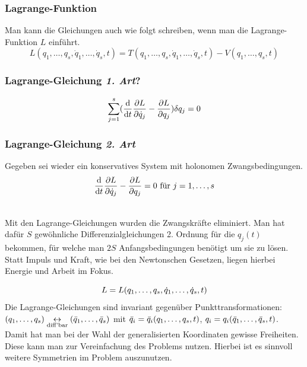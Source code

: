 \subsubsection{Lagrange-Funktion}
Man kann die Gleichungen auch wie folgt schreiben, wenn man die Lagrange-Funktion $L$ einführt.
$$L(q_1, \dots, q_s, \dot{q}_1, \dots, \dot{q}_s, t) = T(q_1, \dots, q_s, \dot{q}_1, \dots, \dot{q}_s, t) - V(q_1, \dots, q_s, t)$$

\subsubsection{Lagrange-Gleichung \textit{1. Art}?}
$$\sum_{j = 1}^s  (  \frac{\mathrm d}{\mathrm d t} \frac{\partial L}{\partial \dot{q}_j} - \frac{\partial L}{\partial q_j}  ) \delta q_j = 0$$

\subsubsection{Lagrange-Gleichung \textit{2. Art}}
Gegeben sei wieder ein konservatives System mit holonomen Zwangsbedingungen.
$$ \frac{\mathrm d}{\mathrm d t} \frac{\partial L}{\partial \dot{q}_j} - \frac{\partial L}{\partial q_j} = 0 \text{~für~} j= 1, \dots, s$$

\begin{bemerkung*}[Fazit]~\\
	Mit den Lagrange-Gleichungen wurden die Zwangskräfte eliminiert. Man hat dafür $S$ gewöhnliche Differenzialgleichungen 2. Ordnung für die $q_j(t)$ bekommen, für welche man $2S$ Anfangsbedingungen benötigt um sie zu lösen.
	Statt Impuls und Kraft, wie bei den Newtonschen Gesetzen, liegen hierbei Energie und Arbeit im Fokus.
\end{bemerkung*}

\begin{bemerkung*}[Ausblick]
	$$L = L(q_1, \dots, q_s, \dot{q}_1, \dots, \dot{q}_s, t)$$
	Die Lagrange-Gleichungen sind invariant gegenüber Punkttransformationen: 
	$(q_1, \dots, q_s) \underset{\text{diff'bar}}{\leftrightarrow} (\bar{q}_1, \dots, \bar{q}_s)$ mit $\bar{q}_i = \bar{q}_i(q_1, \dots, q_s, t)$, $q_i = q_i(\bar{q}_1, \dots, \bar{q}_s, t)$.
	Damit hat man bei der Wahl der generalisierten Koordinaten gewisse Freiheiten. Diese kann man zur Vereinfachung des Problems nutzen. Hierbei ist es sinnvoll weitere Symmetrien im Problem auszunutzen.
\end{bemerkung*}

